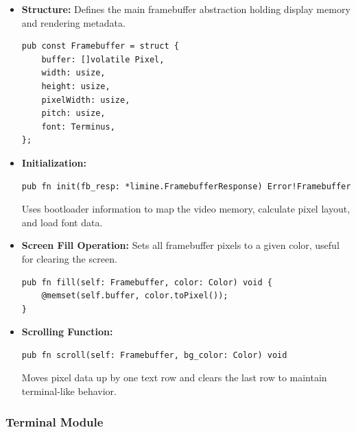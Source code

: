 \documentclass[12pt]{extarticle}
\begin{document}
\begin{itemize}
    \item \textbf{Structure:} Defines the main framebuffer abstraction holding display memory and rendering metadata.
    \begin{lstlisting}[language=zig, breaklines=true, basicstyle=\ttfamily\footnotesize]
pub const Framebuffer = struct {
    buffer: []volatile Pixel,
    width: usize,
    height: usize,
    pixelWidth: usize,
    pitch: usize,
    font: Terminus,
};
    \end{lstlisting}

    \item \textbf{Initialization:}
    \begin{lstlisting}[language=zig, breaklines=true, basicstyle=\ttfamily\footnotesize]
pub fn init(fb_resp: *limine.FramebufferResponse) Error!Framebuffer
    \end{lstlisting}
    Uses bootloader information to map the video memory, calculate pixel layout, and load font data.

    \item \textbf{Screen Fill Operation:}  
    Sets all framebuffer pixels to a given color, useful for clearing the screen.
    \begin{lstlisting}[language=zig, breaklines=true, basicstyle=\ttfamily\footnotesize]
pub fn fill(self: Framebuffer, color: Color) void {
    @memset(self.buffer, color.toPixel());
}
    \end{lstlisting}

    \item \textbf{Scrolling Function:}
    \begin{lstlisting}[language=zig, breaklines=true, basicstyle=\ttfamily\footnotesize]
pub fn scroll(self: Framebuffer, bg_color: Color) void
    \end{lstlisting}
    Moves pixel data up by one text row and clears the last row to maintain terminal-like behavior.
\end{itemize}

\subsubsection*{Terminal Module}
\end{document}
